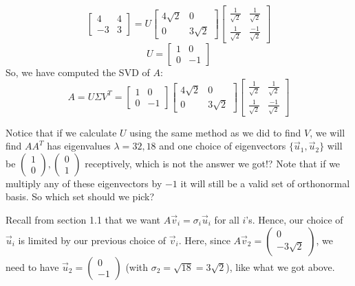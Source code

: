 \documentclass{article}
\begin{document}
$$\begin{bmatrix}4& 4\\-3& 3\end{bmatrix} = U \begin{bmatrix}4\sqrt{2}& 0\\0& 3\sqrt{2}\end{bmatrix}
\begin{bmatrix}\frac{1}{\sqrt{2}}&\frac{1}{\sqrt{2}}\\\frac{1}{\sqrt{2}}&\frac{-1}{\sqrt{2}}\end{bmatrix}$$
$$U = \begin{bmatrix}1& 0\\0& -1\end{bmatrix}$$
So, we have computed the SVD of $A$:
$$A = U \Sigma V^T = \begin{bmatrix}1& 0\\0& -1\end{bmatrix}
\begin{bmatrix}4\sqrt{2}& 0\\0& 3\sqrt{2}\end{bmatrix}
\begin{bmatrix}\frac{1}{\sqrt{2}}&\frac{1}{\sqrt{2}}\\\frac{1}{\sqrt{2}}&\frac{-1}{\sqrt{2}}\end{bmatrix}$$

Notice that if we calculate $U$ using the same method as we did to find $V$, we will find $AA^T$ has eigenvalues $\lambda = 32, 18$ and one choice of eigenvectors $\{ \vec{u}_1, \vec{u}_2 \}$  will be $\begin{pmatrix}  1 \\ 0 \end{pmatrix}, \begin{pmatrix}  0 \\ 1 \end{pmatrix}$ receptively, which is not the answer we got!? Note that if we multiply any of these eigenvectors by $-1$ it will still be a valid set of orthonormal basis. So which set should we pick?

Recall from section 1.1 that we want $ A \vec{v}_i = \sigma_i \vec{u}_i$ for all $i$'s. Hence, our choice of $\vec{u}_i$ is limited by our previous choice of $\vec{v}_i$. Here, since $A\vec{v}_2= \begin{pmatrix} 0 \\  -3 \sqrt{2} \end{pmatrix}$, we need to have $\vec{u}_2 = \begin{pmatrix}   0 \\ -1 \end{pmatrix}$ (with $\sigma_2 = \sqrt{18} = 3 \sqrt{2}$), like what we got above.
\end{document}
